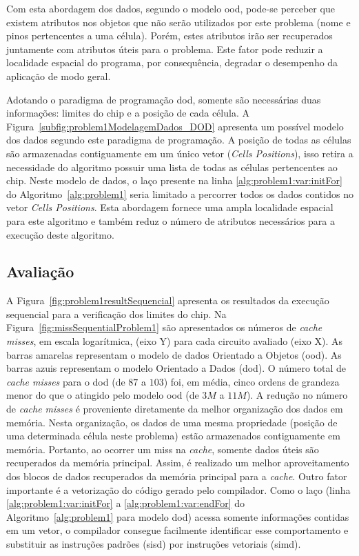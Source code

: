 Com esta abordagem dos dados, segundo o modelo \ac{ood}, pode-se perceber que existem atributos nos objetos que não serão utilizados por este problema (nome e pinos pertencentes a uma célula).
Porém, estes atributos irão ser recuperados juntamente com atributos úteis para o problema.
Este fator pode reduzir a localidade espacial do programa, por consequência, degradar o desempenho da aplicação de modo geral.

Adotando o paradigma de programação \ac{dod}, somente são necessárias duas informações: limites do chip e a posição de cada célula.
A Figura~\ref{subfig:problem1ModelagemDados_DOD} apresenta um possível modelo dos dados segundo este paradigma de programação.
A posição de todas as células são armazenadas contiguamente em um único vetor (\textit{Cells  Positions}), isso retira a necessidade do algoritmo possuir uma lista de todas as células pertencentes ao chip.
Neste modelo de dados, o laço presente na linha \ref{alg:problem1:var:initFor} do Algoritmo~\ref{alg:problem1} seria limitado a percorrer todos os dados contidos no vetor \textit{Cells  Positions}.
Esta abordagem fornece uma ampla localidade espacial para este algoritmo e também reduz o número de atributos necessários para a execução deste algoritmo.

\subsection{Avaliação}

A Figura~\ref{fig:problem1resultSequencial} apresenta os resultados da execução sequencial para a verificação dos limites do chip.
Na Figura~\ref{fig:missSequentialProblem1} são apresentados os números de  \textit{cache misses}, em escala logarítmica, (eixo Y) para cada circuito avaliado (eixo X). As barras amarelas representam o modelo de dados Orientado a Objetos (\ac{ood}). As barras azuis representam o modelo Orientado a Dados (\ac{dod}). O número total de  \textit{cache misses} para o \ac{dod} (de $87$ a $103$) foi, em média, cinco ordens de grandeza menor do que o atingido pelo modelo \ac{ood} (de $3M$ a $11M$). A redução no número de  \textit{cache misses} é proveniente diretamente da melhor organização dos dados em memória. Nesta organização, os dados de uma mesma propriedade (posição de uma determinada célula neste problema) estão armazenados contiguamente em memória. Portanto, ao ocorrer um miss na \textit{cache}, somente dados úteis são recuperados da memória principal. Assim, é realizado um melhor aproveitamento dos blocos de dados recuperados da memória principal para a \textit{cache}.
Outro fator importante é a vetorização do código gerado pelo compilador. Como o laço (linha \ref{alg:problem1:var:initFor} a \ref{alg:problem1:var:endFor} do Algoritmo~\ref{alg:problem1} para modelo \ac{dod}) acessa somente informações contidas em um vetor, o compilador consegue facilmente identificar esse comportamento e substituir as instruções padrões (\ac{sisd}) por instruções vetoriais (\ac{simd}).

